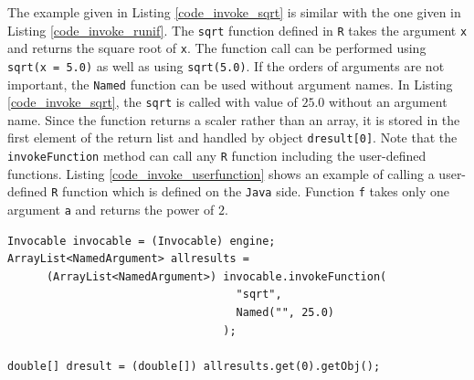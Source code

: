 \documentclass[10pt,a4paper, final, oneside]{article}
\begin{document}
The example given in Listing \ref{code_invoke_sqrt} is similar with the one given in Listing \ref{code_invoke_runif}. The \texttt{sqrt} function defined in \texttt{R} takes the argument \texttt{x} and returns the square root of \texttt{x}. The function call can be performed using \texttt{sqrt(x = 5.0)} as well as using \texttt{sqrt(5.0)}. If the orders of arguments are not important, the \texttt{Named} function can be used without argument names. In Listing \ref{code_invoke_sqrt}, the \texttt{sqrt} is called with value of $25.0$ without an argument name. Since the function returns a scaler rather than an array, it is stored in the first element of the return list and handled by object \texttt{dresult[0]}. Note that the \texttt{invokeFunction} method can call any \texttt{R} function including the user-defined functions. Listing \ref{code_invoke_userfunction} shows an example of calling a user-defined \texttt{R} function which is defined on the \texttt{Java} side. Function \texttt{f} takes only one argument \texttt{a} and returns the power of $2$.

\begin{minipage}{\linewidth}
\begin{lstlisting}[caption=Invoking sqrt,label=code_invoke_sqrt]
Invocable invocable = (Invocable) engine;
ArrayList<NamedArgument> allresults = 
      (ArrayList<NamedArgument>) invocable.invokeFunction(
                                   "sqrt", 
                                   Named("", 25.0)
                                 );
                                 
double[] dresult = (double[]) allresults.get(0).getObj();
\end{lstlisting}
\end{minipage}
        
\end{document}
